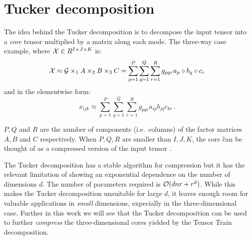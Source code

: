 \section{Tucker decomposition}
The idea behind the Tucker decomposition is to decompose the input tensor into a \emph{core} tensor multiplied by a matrix along each mode.
The three-way case example, where $\mathcal{X} \in R^{I \times J \times K}$ is:
\begin{equation*}
  \mathcal{X} \approx \mathcal{G} \times_1 A \times_2 B \times_3 C = \sum_{p=1}^P \sum_{q=1}^Q \sum_{r=1}^R g_{pqr} a_p \circ b_q \circ c_r
\end{equation*}
and in the elementwise form:
\begin{equation*}
  x_{ijk} \approx \sum_{p=1}^P \sum_{q=1}^Q \sum_{r=1}^R g_{pqr} a_{ip} b_{jq} c_{kr}\, .
\end{equation*}

$P, Q$ and $R$ are the number of components (i.e.\ columns) of the factor matrices $A, B$ and $C$ respectively. When $P,Q,R$ are smaller than $I,J,K$, the core \G can be thought of as a compressed version of the input tensor \X.

The Tucker decomposition has a stable algorithm for compression but it has the relevant limitation of showing an exponential dependence on the number of dimensions $d$. The number of parameters required is $\mathcal{O}(dnr+r^d)$.
While this makes the Tucker decomposition unsuitable for large $d$, it leaves enough room for valuable applications in \emph{small} dimensions, expecially in the three-dimensional case. Further in this work we will see that the Tucker decomposition can be used to further \emph{compress} the three-dimensional cores yielded by the Tensor Train decomposition.
